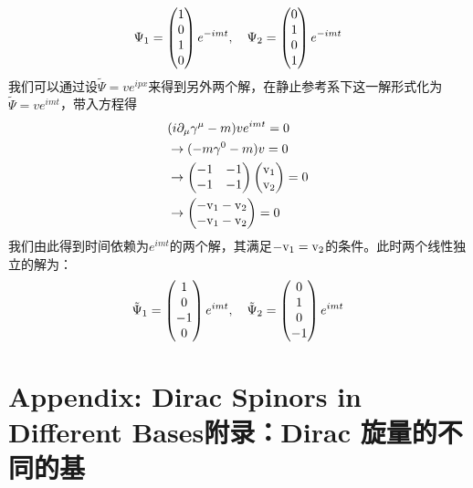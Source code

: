 \begin{equation}
\Psi_1=\begin{pmatrix} 1\\0\\1\\0 \end{pmatrix} e^{-imt},~~~\Psi_2=\begin{pmatrix} 0\\1\\0\\1 \end{pmatrix} e^{-imt}
\end{equation}
我们可以通过设$\tilde \Psi =ve^{ipx}$来得到另外两个解，在静止参考系下这一解形式化为$\tilde \Psi=ve^{imt}$，带入方程得
\begin{equation}
\begin{split}
&(i\partial_\mu\gamma^\mu-m)ve^{imt}=0\\
&\to (-m\gamma^0-m)v=0\\
&\to \begin{pmatrix} -1 & -1 \\ -1 & -1 \end{pmatrix} \begin{pmatrix} \rm v_1 \\ \rm v_2 \end{pmatrix} =0\\
&\to \begin{pmatrix} \rm -v_1-v_2 \\ \rm -v_1-v_2 \end{pmatrix} =0
\end{split}
\end{equation}
我们由此得到时间依赖为$e^{imt}$的两个解，其满足$\rm -v_1=v_2$的条件。此时两个线性独立的解为：
\begin{equation}
\tilde \Psi_1=\begin{pmatrix} 1\\0\\-1\\0 \end{pmatrix} e^{imt},~~~\tilde \Psi_2=\begin{pmatrix} 0\\1\\0\\-1 \end{pmatrix} e^{imt}
\end{equation}



\section[附录：Dirac 旋量的不同的基]{Appendix: Dirac Spinors in Different Bases\quad 附录：Dirac 旋量的不同的基}\label{sec8.10}

